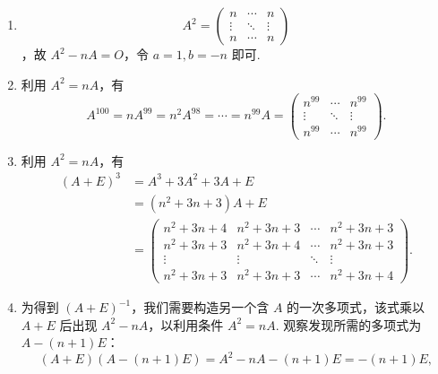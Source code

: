 \documentclass[12pt,fontset=fandol]{ctexart}
\begin{document}
\begin{solve}
\begin{enumerate}
                \item 
\[A^2 = \begin{pmatrix}
                        n      & \cdots & n      \\
                        \vdots & \ddots & \vdots \\
                        n      & \cdots & n
                    \end{pmatrix}\]
，故 $A^2 - nA = O$，令 $a=1, b=-n$ 即可.

                \item 利用 $A^2 = nA$，有
                    \[
                        A^{100} = n A^{99} = n^2 A^{98} = \cdots = n^{99} A = \begin{pmatrix}
                            n^{99} & \cdots & n^{99} \\
                            \vdots & \ddots & \vdots \\
                            n^{99} & \cdots & n^{99}
                        \end{pmatrix}.
                    \]

                \item 利用 $A^2 = nA$，有
                    \begin{align*}
                        (A+E)^3 &= A^3 + 3A^2 + 3A + E \\
                                &= (n^2 + 3n + 3)A + E \\
                                &= \begin{pmatrix}
                                    n^2 + 3n + 4 & n^2 + 3n + 3 & \cdots & n^2 + 3n + 3 \\
                                    n^2 + 3n + 3 & n^2 + 3n + 4 & \cdots & n^2 + 3n + 3 \\
                                    \vdots & \vdots & \ddots & \vdots \\
                                    n^2 + 3n + 3 & n^2 + 3n + 3 & \cdots & n^2 + 3n + 4
                                \end{pmatrix}.
                    \end{align*}

                \item 为得到 $(A+E)^{-1}$，我们需要构造另一个含 $A$ 的一次多项式，该式乘以 $A+E$ 后出现 $A^2 - nA$，以利用条件 $A^2 = nA$. 观察发现所需的多项式为 $A - (n+1)E$：
                    \[
                        (A+E)(A-(n+1)E) = A^2 - nA -(n+1)E = -(n+1)E,
                    \]


\end{enumerate}
\end{solve}
\end{document}
